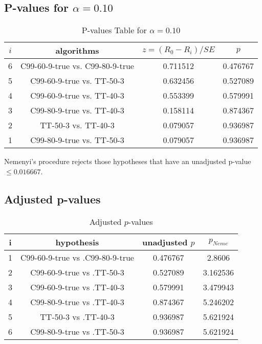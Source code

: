 \documentclass[a4paper,10pt]{article}
\begin{document}
\begin{landscape}
\pagebreak

\subsection{P-values for $\alpha=0.10$}

\begin{table}[!htp]
\centering\scriptsize
\begin{tabular}{cccc}
$i$&algorithms&$z=(R_0 - R_i)/SE$&$p$\\
\hline6&C99-60-9-true vs. C99-80-9-true&0.711512&0.476767\\
5&C99-60-9-true vs. TT-50-3&0.632456&0.527089\\
4&C99-60-9-true vs. TT-40-3&0.553399&0.579991\\
3&C99-80-9-true vs. TT-40-3&0.158114&0.874367\\
2&TT-50-3 vs. TT-40-3&0.079057&0.936987\\
1&C99-80-9-true vs. TT-50-3&0.079057&0.936987\\
\hline
\end{tabular}
\caption{P-values Table for $\alpha=0.10$}
\end{table}Nemenyi's procedure rejects those hypotheses that have an unadjusted p-value $\le0.016667$.

\pagebreak

\subsection{Adjusted p-values}

\begin{table}[!htp]
\centering\scriptsize
\begin{tabular}{cccc}
i&hypothesis&unadjusted $p$&$p_{Neme}$\\
\hline1&C99-60-9-true vs .C99-80-9-true&0.476767&2.8606\\
2&C99-60-9-true vs .TT-50-3&0.527089&3.162536\\
3&C99-60-9-true vs .TT-40-3&0.579991&3.479943\\
4&C99-80-9-true vs .TT-40-3&0.874367&5.246202\\
5&TT-50-3 vs .TT-40-3&0.936987&5.621924\\
6&C99-80-9-true vs .TT-50-3&0.936987&5.621924\\
\hline
\end{tabular}
\caption{Adjusted $p$-values}
\end{table}

\end{landscape}
\end{document}
